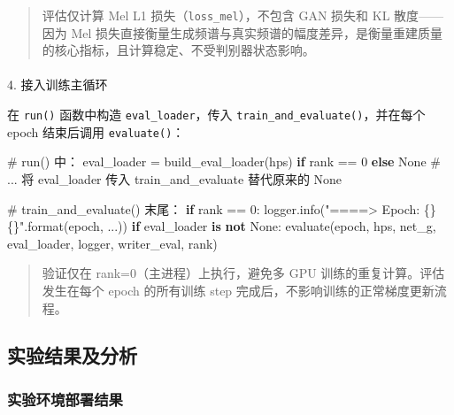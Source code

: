 \documentclass[
  english,
  letterpaper,
  DIV=11,
  numbers=noendperiod]{scrartcl}
\makeatletter
\let\oldparagraph\paragraph
\renewcommand{\paragraph}{
    \@ifstar
      \xxxParagraphStar
      \xxxParagraphNoStar
  }
\newcommand{\xxxParagraphStar}[1]{\oldparagraph*{#1}\mbox{}}
\newcommand{\xxxParagraphNoStar}[1]{\oldparagraph{#1}\mbox{}}
\newenvironment{Shaded}{\begin{snugshade}}{\end{snugshade}}
\newcommand{\BuiltInTok}[1]{\textcolor[rgb]{0.00,0.23,0.31}{#1}}
\newcommand{\CommentTok}[1]{\textcolor[rgb]{0.37,0.37,0.37}{#1}}
\newcommand{\ControlFlowTok}[1]{\textcolor[rgb]{0.00,0.23,0.31}{\textbf{#1}}}
\newcommand{\DecValTok}[1]{\textcolor[rgb]{0.68,0.00,0.00}{#1}}
\newcommand{\KeywordTok}[1]{\textcolor[rgb]{0.00,0.23,0.31}{\textbf{#1}}}
\newcommand{\NormalTok}[1]{\textcolor[rgb]{0.00,0.23,0.31}{#1}}
\newcommand{\OperatorTok}[1]{\textcolor[rgb]{0.37,0.37,0.37}{#1}}
\newcommand{\SpecialCharTok}[1]{\textcolor[rgb]{0.37,0.37,0.37}{#1}}
\newcommand{\StringTok}[1]{\textcolor[rgb]{0.13,0.47,0.30}{#1}}
\newcommand{\VariableTok}[1]{\textcolor[rgb]{0.07,0.07,0.07}{#1}}
\makeatother
\begin{document}
\begin{quote}
评估仅计算 Mel L1 损失（\texttt{loss\_mel}），不包含 GAN 损失和 KL
散度------因为 Mel
损失直接衡量生成频谱与真实频谱的幅度差异，是衡量重建质量的核心指标，且计算稳定、不受判别器状态影响。
\end{quote}

\paragraph{4.
接入训练主循环}\label{ux63a5ux5165ux8badux7ec3ux4e3bux5faaux73af}

在 \texttt{run()} 函数中构造 \texttt{eval\_loader}，传入
\texttt{train\_and\_evaluate()}，并在每个 epoch 结束后调用
\texttt{evaluate()}：

\begin{Shaded}
\begin{Highlighting}[]
\CommentTok{\# run() 中：}
\NormalTok{eval\_loader }\OperatorTok{=}\NormalTok{ build\_eval\_loader(hps) }\ControlFlowTok{if}\NormalTok{ rank }\OperatorTok{==} \DecValTok{0} \ControlFlowTok{else} \VariableTok{None}
\CommentTok{\# ... 将 eval\_loader 传入 train\_and\_evaluate 替代原来的 None}

\CommentTok{\# train\_and\_evaluate() 末尾：}
\ControlFlowTok{if}\NormalTok{ rank }\OperatorTok{==} \DecValTok{0}\NormalTok{:}
\NormalTok{    logger.info(}\StringTok{"====\textgreater{} Epoch: }\SpecialCharTok{\{\}}\StringTok{ }\SpecialCharTok{\{\}}\StringTok{"}\NormalTok{.}\BuiltInTok{format}\NormalTok{(epoch, ...))}
    \ControlFlowTok{if}\NormalTok{ eval\_loader }\KeywordTok{is} \KeywordTok{not} \VariableTok{None}\NormalTok{:}
\NormalTok{        evaluate(epoch, hps, net\_g, eval\_loader, logger, writer\_eval, rank)}
\end{Highlighting}
\end{Shaded}

\begin{quote}
验证仅在 rank=0（主进程）上执行，避免多 GPU
训练的重复计算。评估发生在每个 epoch 的所有训练 step
完成后，不影响训练的正常梯度更新流程。
\end{quote}

\subsection{实验结果及分析}\label{ux5b9eux9a8cux7ed3ux679cux53caux5206ux6790-1}

\subsubsection{实验环境部署结果}\label{ux5b9eux9a8cux73afux5883ux90e8ux7f72ux7ed3ux679c}
\end{document}
